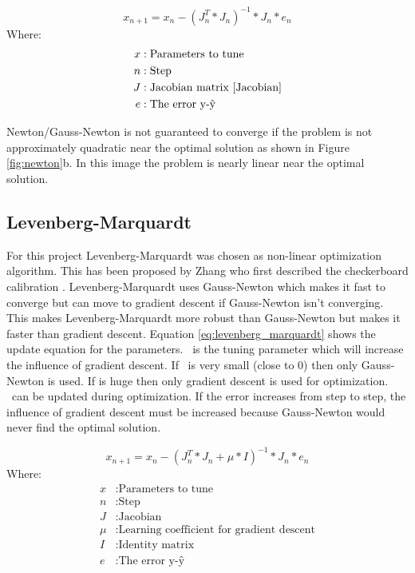 \documentclass[11pt,a4paper,titlepage,oneside]{report}
\begin{document}
\begin{equation}\label{eq:gauss_newton}
  x_{n+1} = x_n - (J_n^T*J_n)^{-1}*J_n*e_n
\end{equation}
Where:
\begin{align*}
  x		  &: \text{Parameters to tune}\\
  n		  &: \text{Step}\\
	J		  &: \text{Jacobian matrix \cite{Jacobian}}\\
  e  	  &: \text{The error y-ŷ}
\end{align*}

Newton/Gauss-Newton is not guaranteed to converge if the problem is not approximately quadratic near the optimal solution as shown in Figure \ref{fig:newton}b. In this image the problem is nearly linear near the optimal solution.

\subsection{Levenberg-Marquardt}
For this project Levenberg-Marquardt was chosen as non-linear optimization algorithm. This has been proposed by Zhang who first described the checkerboard calibration \cite{Zhang}. Levenberg-Marquardt uses Gauss-Newton which makes it fast to converge but can move to gradient descent if Gauss-Newton isn't converging. This makes Levenberg-Marquardt more robust than Gauss-Newton but makes it faster than gradient descent. Equation \ref{eq:levenberg_marquardt} shows the update equation for the parameters. \mu\ is the tuning parameter which will increase the influence of gradient descent. If \mu\ is very small (close to 0) then only Gauss-Newton is used. If \mu is huge then only gradient descent is used for optimization. \mu\ can be updated during optimization. If the error increases from step to step, the influence of gradient descent must be increased because Gauss-Newton would never find the optimal solution.

\begin{equation}\label{eq:levenberg_marquardt}
  x_{n+1} = x_n - (J_n^T*J_n + \mu*I)^{-1}*J_n*e_n
\end{equation}
Where:
\begin{align*}
  x		  &: \text{Parameters to tune}\\
  n		  &: \text{Step}\\
  J		  &: \text{Jacobian}\\
  \mu	  &: \text{Learning coefficient for gradient descent}\\
  I     &: \text{Identity matrix}\\
  e  	  &: \text{The error y-ŷ}
\end{align*}
\end{document}
